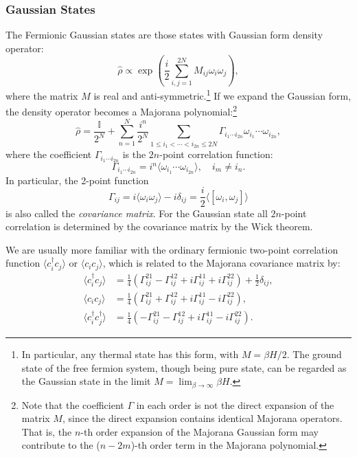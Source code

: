 \documentclass[aps,prb,superscriptaddress,nofootinbib]{revtex4}
\begin{document}
\subsubsection{Gaussian States}
The Fermionic Gaussian states are those states with Gaussian form density operator:
\begin{equation}
	\hat \rho \propto \exp \left(\frac{i}{2}\sum_{i,j=1}^{2N}M_{ij}\omega_i \omega_j \right),
\end{equation}
where the matrix $M$ is real and anti-symmetric.\footnote{In particular, any thermal state has this form, with $M = \beta H/2$. The ground state of the free fermion system, though being pure state, can be regarded as the Gaussian state in the limit $M = \lim_{\beta \rightarrow \infty} \beta H$.}
If we expand the Gaussian form, the density operator becomes a Majorana polynomial:\footnote{Note that the coefficient $\Gamma$ in each order is not the direct expansion of the matrix $M$, since the direct expansion contains identical Majorana operators. That is, the $n$-th order expansion of the Majorana Gaussian form may contribute to the ($n-2m$)-th order term in the Majorana polynomial.}
\begin{equation}
	\hat{\rho} = \frac{\mathbb{I}}{2^N} + \sum_{n=1}^{N}\frac{i^n}{2^N}\sum_{1\le i_{1}<\cdots<i_{2n} \le 2N}\Gamma_{i_{1}\cdots i_{2n}} \omega_{i_1}\cdots\omega_{i_{2n}},
\end{equation}
where the coefficient $\Gamma_{i_1 \cdots i_{2n}}$ is the $2n$-point correlation function:
\begin{equation}
	\Gamma_{i_1 \cdots i_{2n}} = i^n \langle \omega_{i_1} \cdots \omega_{i_{2n}}\rangle, \quad i_m \ne i_n.
\end{equation}
In particular, the 2-point function 
\begin{equation}
	\Gamma_{ij} = i\langle \omega_i \omega_j\rangle - i\delta_{ij} = \frac{i}{2}\langle [\omega_i, \omega_j]\rangle
\end{equation}
is also called the \textit{covariance matrix}. 
For the Gaussian state all $2n$-point correlation is determined by the covariance matrix by the Wick theorem.

We are usually more familiar with the ordinary fermionic two-point correlation function $\langle c^\dagger_i c_j\rangle$ or $\langle c_i c_j\rangle$, which is related to the Majorana covariance matrix by:
\begin{equation}
\begin{aligned}
	\langle c_i^\dagger c_j\rangle &= \frac{1}{4}(
		\Gamma^{21}_{ij} - \Gamma^{12}_{ij} + 
		i \Gamma^{11}_{ij} + i \Gamma^{22}_{ij})
		+\frac{1}{2}\mathbb \delta_{ij}, \\
	\langle c_i c_j\rangle &= \frac{1}{4}(
		\Gamma^{21}_{ij} + \Gamma^{12}_{ij} + 
		i \Gamma^{11}_{ij} - i \Gamma^{22}_{ij}), \\
	\langle c_i^\dagger c_j^\dagger\rangle &= \frac{1}{4}(
		-\Gamma^{21}_{ij} - \Gamma^{12}_{ij} + 
		i \Gamma^{11}_{ij} - i \Gamma^{22}_{ij}).
\end{aligned}
\end{equation}
\end{document}
